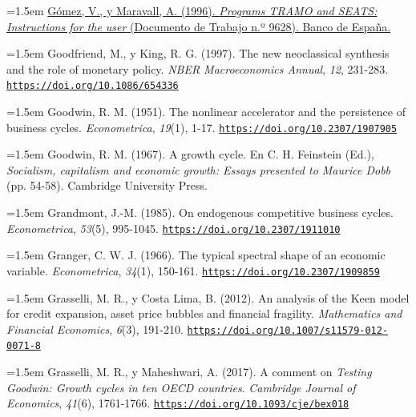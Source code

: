 \documentclass[10pt,a4paper]{article}
\begin{document}
\noindent\hangindent=1.5em \href{https://www.bde.es/f/webbde/SES/Secciones/Publicaciones/PublicacionesSeriadas/DocumentosTrabajo/96/Fich/dt9628e.pdf}{Gómez, V., y Maravall, A. (1996). \textit{Programs TRAMO and SEATS: Instructions for the user} (Documento de Trabajo n.º 9628). Banco de España.}

\noindent\hangindent=1.5em Goodfriend, M., y King, R. G. (1997). The new neoclassical synthesis and the role of monetary policy. \textit{NBER Macroeconomics Annual}, \textit{12}, 231-283. \href{https://doi.org/10.1086/654336}{\nolinkurl{https://doi.org/10.1086/654336}}

\noindent\hangindent=1.5em Goodwin, R. M. (1951). The nonlinear accelerator and the persistence of business cycles. \textit{Econometrica}, \textit{19}(1), 1-17. \href{https://doi.org/10.2307/1907905}{\nolinkurl{https://doi.org/10.2307/1907905}}

\noindent\hangindent=1.5em Goodwin, R. M. (1967). A growth cycle. En C. H. Feinstein (Ed.), \textit{Socialism, capitalism and economic growth: Essays presented to Maurice Dobb} (pp. 54-58). Cambridge University Press.

\noindent\hangindent=1.5em Grandmont, J.-M. (1985). On endogenous competitive business cycles. \textit{Econometrica}, \textit{53}(5), 995-1045. \href{https://doi.org/10.2307/1911010}{\nolinkurl{https://doi.org/10.2307/1911010}}

\noindent\hangindent=1.5em Granger, C. W. J. (1966). The typical spectral shape of an economic variable. \textit{Econometrica}, \textit{34}(1), 150-161. \href{https://doi.org/10.2307/1909859}{\nolinkurl{https://doi.org/10.2307/1909859}}

{\sloppy\noindent\hangindent=1.5em Grasselli, M. R., y Costa Lima, B. (2012). An analysis of the Keen model for credit expansion, asset price bubbles and financial fragility. \textit{Mathematics and Financial Economics}, \textit{6}(3), 191-210. \href{https://doi.org/10.1007/s11579-012-0071-8}{\nolinkurl{https://doi.org/10.1007/s11579-012-0071-8}}\par}

\noindent\hangindent=1.5em Grasselli, M. R., y Maheshwari, A. (2017). A comment on \textit{Testing Goodwin: Growth cycles in ten OECD countries}. \textit{Cambridge Journal of Economics}, \textit{41}(6), 1761-1766. \href{https://doi.org/10.1093/cje/bex018}{\nolinkurl{https://doi.org/10.1093/cje/bex018}}
\end{document}
